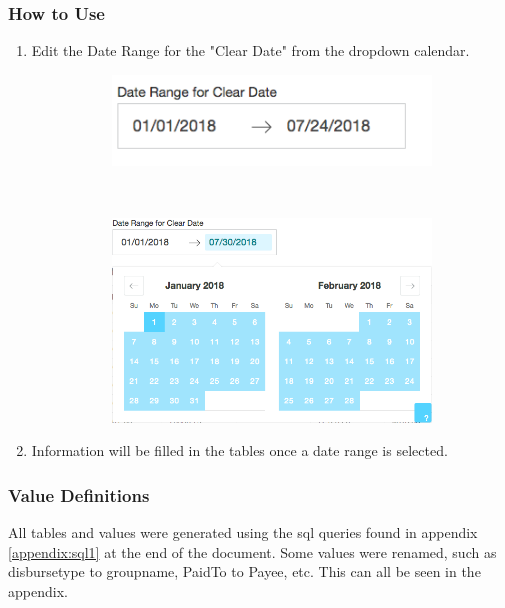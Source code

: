 \documentclass[titlepage]{article}
\begin{document}
\subsubsection{How to Use}
\begin{enumerate}
	\item Edit the Date Range for the "Clear Date" from the dropdown calendar.
	\begin{figure}[h]
		\begin{subfigure}[b]{.5\textwidth}
			\includegraphics[scale=.5]{./pics/bank_reconcillation_dateRange_detail.png}
		\end{subfigure}
		~
		\begin{subfigure}[b]{.5\textwidth}
			\includegraphics[scale=.3]{./pics/bank_reconcillation_dateRange_dropdown_detail.png}
		\end{subfigure}
	\end{figure}
	\item Information will be filled in the tables once a date range is selected.
\end{enumerate}
\subsubsection{Value Definitions}
All tables and values were generated using the sql queries found in appendix \ref{appendix:sql1} at the end of the document. Some values were renamed, such as disbursetype to groupname, PaidTo to Payee, etc. This can all be seen in the appendix. 
\end{document}
